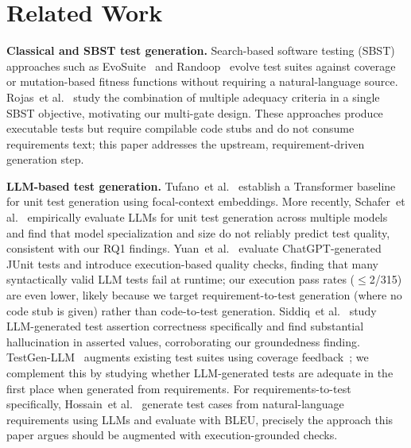 \documentclass[conference]{IEEEtran}
\newcommand{\etal}{et al.}
\begin{document}
\section{Related Work}

\textbf{Classical and SBST test generation.}
Search-based software testing (SBST)~\cite{mcminn2004sbst} approaches such as EvoSuite~\cite{fraser2011evosuite}
and Randoop~\cite{pacheco2007randoop} evolve test suites against coverage or
mutation-based fitness functions without requiring a natural-language source.
Rojas~\etal~\cite{rojas2015combining} study the combination of multiple adequacy
criteria in a single SBST objective, motivating our multi-gate design. These
approaches produce executable tests but require compilable code stubs and do
not consume requirements text; this paper addresses the upstream,
requirement-driven generation step.

\textbf{LLM-based test generation.}
Tufano~\etal~\cite{tufano2022unit} establish a Transformer baseline for unit
test generation using focal-context embeddings. More recently,
Schafer~\etal~\cite{schafer2023empirical} empirically evaluate LLMs for unit
test generation across multiple models and find that model specialization and
size do not reliably predict test quality, consistent with our RQ1 findings.
Yuan~\etal~\cite{yuan2023chatgpt} evaluate ChatGPT-generated JUnit tests and
introduce execution-based quality checks, finding that many syntactically
valid LLM tests fail at runtime; our execution pass rates ($\leq$2/315)
are even lower, likely because we target requirement-to-test generation
(where no code stub is given) rather than code-to-test generation.
Siddiq~\etal~\cite{siddiq2023empirical} study LLM-generated test assertion
correctness specifically and find substantial hallucination in asserted
values, corroborating our groundedness finding.
TestGen-LLM~\cite{alshahwan2024testgenllm} augments existing test suites
using coverage feedback~\cite{lemieux2023codamosa,pizzorno2024coverup,chen2024chatunitest}; we complement this by studying whether LLM-generated
tests are adequate in the first place when generated from requirements.
For requirements-to-test specifically, Hossain~\etal~\cite{hossain2024llmreq}
generate test cases from natural-language requirements using LLMs and evaluate
with BLEU, precisely the approach this paper argues should be augmented with
execution-grounded checks.
\end{document}
